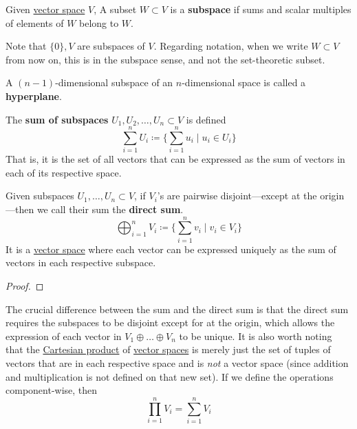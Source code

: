   \begin{definition}[Subspace]
    \label{def:subspace}
    Given \hyperref[def:vector-space]{vector space} $V$, A subset $W \subset V$ is a \textbf{subspace} if sums and scalar multiples of elements of $W$ belong to $W$. 
  \end{definition}

  Note that $\{ 0 \}, V$ are subspaces of $V$. Regarding notation, when we write $W \subset V$ from now on, this is in the subspace sense, and not the set-theoretic subset. 

  \begin{definition}[Hyperplane]
    \label{def:hyperplane}
    A $(n - 1)$-dimensional subspace of an $n$-dimensional space is called a \textbf{hyperplane}. 
  \end{definition}

  \begin{definition}
    \label{def:sum-of-subspaces}
    The \textbf{sum of subspaces} $U_1, U_2, \ldots, U_n \subset V$ is defined 
    \begin{equation}
      \sum_{i=1}^n U_i \coloneqq \Big\{ \sum_{i = 1}^n u_i \mid u_i \in U_i\Big\}
    \end{equation}
    That is, it is the set of all vectors that can be expressed as the sum of vectors in each of its respective space. 
  \end{definition}

  \begin{definition}
    \label{def:direct-sum-of-spaces}
    Given subspaces $U_1, \ldots, U_n \subset V$, if $V_i$'s are pairwise disjoint---except at the origin---then we call their sum the \textbf{direct sum}. 
    \begin{equation}
      \bigoplus_{i=1}^n V_i \coloneqq \Big\{ \sum_{i=1}^n v_i \; | \; v_i \in V_i\Big\}
    \end{equation}
    It is a \hyperref[def:vector-space]{vector space} where each vector can be expressed uniquely as the sum of vectors in each respective subspace. 
  \end{definition}
  \begin{proof}
    
  \end{proof}

  The crucial difference between the sum and the direct sum is that the direct sum requires the subspaces to be disjoint except for at the origin, which allows the expression of each vector in $V_1 \oplus \ldots \oplus V_n$ to be unique. It is also worth noting that the \hyperref[st-def:cart-prod-2]{Cartesian product} of \hyperref[def:vector-space]{vector spaces} is merely just the set of tuples of vectors that are in each respective space and is \textit{not} a vector space (since addition and multiplication is not defined on that new set). If we define the operations component-wise, then 
  \begin{equation}
    \prod_{i=1}^n V_i = \sum_{i=1}^n V_i
  \end{equation}

